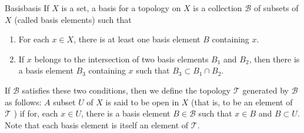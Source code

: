 \begin{definition}{Basis}{basis}
If $X$ is a set, a basis for a topology on $X$ is a collection $\mathcal{B}$ of subsets of $X$ (called basis elements) such that
\begin{enumerate}
    \item For each $x \in X$, there is at least one basis element $B$ containing $x$.
    \item If $x$ belongs to the intersection of two basis elements $B_{1}$ and $B_{2}$, then there is a basis element $B_{3}$ containing $x$ such that $B_{3} \subset B_{1} \cap B_{2}$.
\end{enumerate}
If $\mathcal{B}$ satisfies these two conditions, then we define the topology $\mathcal{T}$ generated by $\mathcal{B}$ as follows: $A$ subset $U$ of $X$ is said to be open in $X$ (that is, to be an element of $\mathcal{T}$ ) if for, each $x \in U$, there is a basis element $B \in \mathcal{B}$ such that $x \in B$ and $B \subset U$. Note that each basis element is itself an element of $\mathcal{T}$.
\end{definition}
